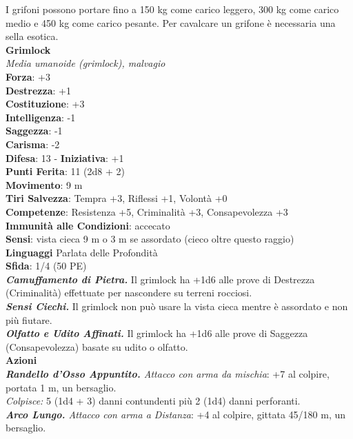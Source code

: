 \begin{multicols}{2}
I grifoni possono portare fino a 150 kg come carico leggero, 300 kg come carico medio e 450 kg come carico pesante. Per cavalcare un grifone è necessaria una sella esotica.\\


\medskip\textbf{Grimlock}\\
\emph{Media umanoide (grimlock), malvagio}\\
\textbf{Forza}: +3\\
\textbf{Destrezza}: +1\\
\textbf{Costituzione}: +3\\
\textbf{Intelligenza}: -1\\
\textbf{Saggezza}: -1\\
\textbf{Carisma}: -2\\
\textbf{Difesa}: 13 - \textbf{Iniziativa}: +1\\
\textbf{Punti Ferita}: 11 (2d8 + 2)\\
\textbf{Movimento}: 9 m\\
\textbf{Tiri Salvezza}: Tempra +3, Riflessi +1, Volontà +0\\
\textbf{Competenze}: Resistenza +5, Criminalità +3, Consapevolezza +3\\
\textbf{Immunità alle Condizioni}: accecato\\
\textbf{Sensi}: vista cieca 9 m o 3 m se assordato (cieco oltre questo raggio)\\
\textbf{Linguaggi} Parlata delle Profondità\\
\textbf{Sfida}: 1/4 (50 PE)\smallskip\\
\emph{\textbf{Camuffamento di Pietra.}} Il grimlock ha +1d6 alle prove di Destrezza (Criminalità) effettuate per nascondere su terreni rocciosi.\\
\emph{\textbf{Sensi Ciechi.}} Il grimlock non può usare la vista cieca mentre è assordato e non più fiutare.\\
\emph{\textbf{Olfatto e Udito Affinati.}} Il grimlock ha +1d6 alle prove di Saggezza (Consapevolezza) basate su udito o olfatto.\\
\smallskip\textbf{Azioni}\\
\emph{\textbf{Randello d'Osso Appuntito.} Attacco con arma da mischia}: +7 al colpire, portata 1 m, un bersaglio.\\
\emph{Colpisce:} 5 (1d4 + 3) danni contundenti più 2 (1d4) danni perforanti.\\
\emph{\textbf{Arco Lungo.} Attacco con arma a Distanza}: +4 al colpire, gittata 45/180 m, un bersaglio.\\

\end{multicols}
